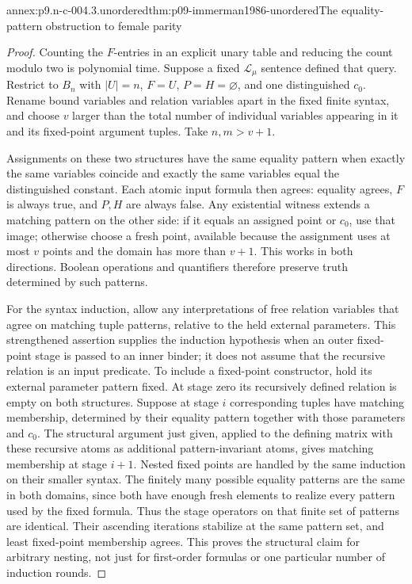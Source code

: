 \begin{annexitem}{annex:p9.n-c-004.3.unordered}{thm:p09-immerman1986-unordered}{The equality-pattern obstruction to female parity}
\begin{proof}
Counting the \(F\)-entries in an explicit unary table and reducing
the count modulo two is polynomial time.  Suppose a fixed
\(\mathcal L_\mu\) sentence defined that query.  Restrict to
\(B_n\) with \(\lvert U\rvert=n\), \(F=U\),
\(P=H=\varnothing\), and one distinguished \(c_0\).
Rename bound variables and relation variables apart in the fixed finite
syntax, and choose \(v\) larger than the total number of individual
variables appearing in it and its fixed-point argument tuples.
Take \(n,m>v+1\).

Assignments on these two structures have the same equality pattern
when exactly the same variables coincide and exactly the same variables
equal the distinguished constant.  Each atomic input formula then
agrees: equality agrees, \(F\) is always true, and \(P,H\)
are always false.  Any existential witness extends a matching pattern
on the other side: if it equals an assigned point or \(c_0\),
use that image; otherwise choose a fresh point, available because the
assignment uses at most \(v\) points and the domain has more than
\(v+1\).  This works in both directions.  Boolean operations and
quantifiers therefore preserve truth determined by such patterns.

For the syntax induction, allow any interpretations of free relation
variables that agree on matching tuple patterns, relative to the held
external parameters.  This strengthened assertion supplies the induction
hypothesis when an outer fixed-point stage is passed to an inner binder;
it does not assume that the recursive relation is an input predicate.
To include a fixed-point constructor, hold its external parameter
pattern fixed.  At stage zero its recursively defined relation is empty
on both structures.  Suppose at stage \(i\) corresponding tuples
have matching membership, determined by their equality pattern together
with those parameters and \(c_0\).  The structural argument just
given, applied to the defining matrix with these recursive atoms as
additional pattern-invariant atoms, gives matching membership at stage
\(i+1\).  Nested fixed points are handled by the same induction
on their smaller syntax.  The finitely many possible equality patterns
are the same in both domains, since both have enough fresh elements
to realize every pattern used by the fixed formula.  Thus the stage
operators on that finite set of patterns are identical.  Their
ascending iterations stabilize at the same pattern set, and least
fixed-point membership agrees.  This proves the structural claim
for arbitrary nesting, not just for first-order formulas or one
particular number of induction rounds.


\end{proof}
\end{annexitem}
